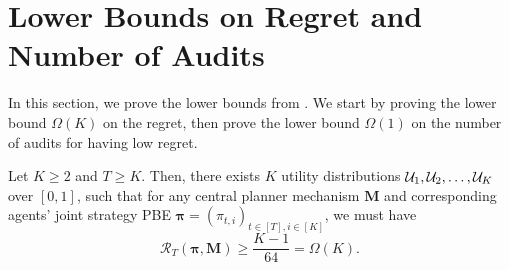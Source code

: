 \section{Lower Bounds on Regret and Number of Audits}\label{sec:lower bounds}

In this section, we prove the lower bounds from . We start by proving the lower bound $\Omega(K)$ on the regret, then prove the lower bound $\Omega(1)$ on the number of audits for having low regret.

\begin{theorem}\label{thm:lower_bound_regret}
Let $K\geq 2$ and $T\geq K$. Then, there exists $K$ utility distributions $\mathcal{U}_1,\mathcal{U}_2,\ldots,\mathcal{U}_K$ over $[0,1]$, such that for any central planner mechanism $\bm M$ and corresponding agents' joint strategy PBE $\bm \pi=(\pi_{t,i})_{t\in [T],i\in[K]}$, we must have
\begin{equation*}
\mathcal R_T(\bm \pi,\bm M) \geq \frac{K-1}{64}=\Omega(K).
\end{equation*}
\end{theorem}
